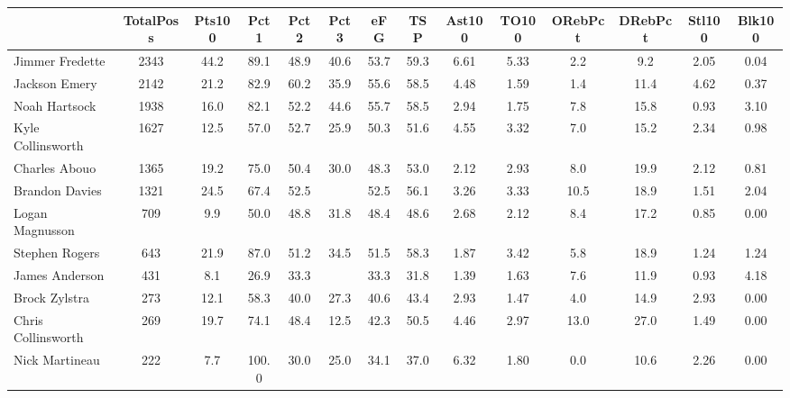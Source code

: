 \documentclass[10pt,letterpaper]{article}
\begin{document}
\begin{table}[ht]
\begin{center}
\begin{tabular}{lccccccccccccc}
  \hline
 & TotalPoss & Pts100 & Pct1 & Pct2 & Pct3 & eFG & TSP & Ast100 & TO100 & ORebPct & DRebPct & Stl100 & Blk100 \\ 
  \hline
Jimmer Fredette & 2343 & 44.2 & 89.1 & 48.9 & 40.6 & 53.7 & 59.3 & 6.61 & 5.33 & 2.2 & 9.2 & 2.05 & 0.04 \\ 
  Jackson Emery & 2142 & 21.2 & 82.9 & 60.2 & 35.9 & 55.6 & 58.5 & 4.48 & 1.59 & 1.4 & 11.4 & 4.62 & 0.37 \\ 
  Noah Hartsock & 1938 & 16.0 & 82.1 & 52.2 & 44.6 & 55.7 & 58.5 & 2.94 & 1.75 & 7.8 & 15.8 & 0.93 & 3.10 \\ 
  Kyle Collinsworth & 1627 & 12.5 & 57.0 & 52.7 & 25.9 & 50.3 & 51.6 & 4.55 & 3.32 & 7.0 & 15.2 & 2.34 & 0.98 \\ 
  Charles Abouo & 1365 & 19.2 & 75.0 & 50.4 & 30.0 & 48.3 & 53.0 & 2.12 & 2.93 & 8.0 & 19.9 & 2.12 & 0.81 \\ 
  Brandon Davies & 1321 & 24.5 & 67.4 & 52.5 &  & 52.5 & 56.1 & 3.26 & 3.33 & 10.5 & 18.9 & 1.51 & 2.04 \\ 
  Logan Magnusson & 709 & 9.9 & 50.0 & 48.8 & 31.8 & 48.4 & 48.6 & 2.68 & 2.12 & 8.4 & 17.2 & 0.85 & 0.00 \\ 
  Stephen Rogers & 643 & 21.9 & 87.0 & 51.2 & 34.5 & 51.5 & 58.3 & 1.87 & 3.42 & 5.8 & 18.9 & 1.24 & 1.24 \\ 
  James Anderson & 431 & 8.1 & 26.9 & 33.3 &  & 33.3 & 31.8 & 1.39 & 1.63 & 7.6 & 11.9 & 0.93 & 4.18 \\ 
  Brock Zylstra & 273 & 12.1 & 58.3 & 40.0 & 27.3 & 40.6 & 43.4 & 2.93 & 1.47 & 4.0 & 14.9 & 2.93 & 0.00 \\ 
  Chris Collinsworth & 269 & 19.7 & 74.1 & 48.4 & 12.5 & 42.3 & 50.5 & 4.46 & 2.97 & 13.0 & 27.0 & 1.49 & 0.00 \\ 
  Nick Martineau & 222 & 7.7 & 100.0 & 30.0 & 25.0 & 34.1 & 37.0 & 6.32 & 1.80 & 0.0 & 10.6 & 2.26 & 0.00 \\ 
   \hline
\end{tabular}
\end{center}
\end{table}
\end{document}
